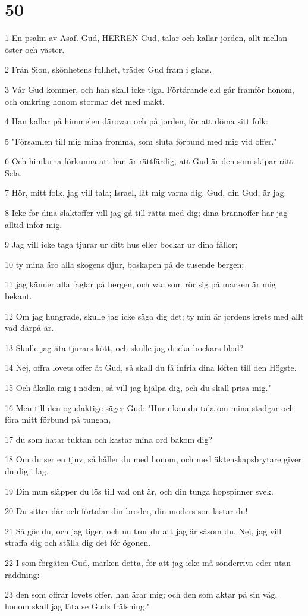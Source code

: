 \chapter{50}

\par 1 En psalm av Asaf. Gud, HERREN Gud, talar och kallar jorden, allt mellan öster och väster.
\par 2 Från Sion, skönhetens fullhet, träder Gud fram i glans.
\par 3 Vår Gud kommer, och han skall icke tiga. Förtärande eld går framför honom, och omkring honom stormar det med makt.
\par 4 Han kallar på himmelen därovan och på jorden, för att döma sitt folk:
\par 5 "Församlen till mig mina fromma, som sluta förbund med mig vid offer."
\par 6 Och himlarna förkunna att han är rättfärdig, att Gud är den som skipar rätt. Sela.
\par 7 Hör, mitt folk, jag vill tala; Israel, låt mig varna dig. Gud, din Gud, är jag.
\par 8 Icke för dina slaktoffer vill jag gå till rätta med dig; dina brännoffer har jag alltid inför mig.
\par 9 Jag vill icke taga tjurar ur ditt hus eller bockar ur dina fållor;
\par 10 ty mina äro alla skogens djur, boskapen på de tusende bergen;
\par 11 jag känner alla fåglar på bergen, och vad som rör sig på marken är mig bekant.
\par 12 Om jag hungrade, skulle jag icke säga dig det; ty min är jordens krets med allt vad därpå är.
\par 13 Skulle jag äta tjurars kött, och skulle jag dricka bockars blod?
\par 14 Nej, offra lovets offer åt Gud, så skall du få infria dina löften till den Högste.
\par 15 Och åkalla mig i nöden, så vill jag hjälpa dig, och du skall prisa mig."
\par 16 Men till den ogudaktige säger Gud: "Huru kan du tala om mina stadgar och föra mitt förbund på tungan,
\par 17 du som hatar tuktan och kastar mina ord bakom dig?
\par 18 Om du ser en tjuv, så håller du med honom, och med äktenskapsbrytare giver du dig i lag.
\par 19 Din mun släpper du lös till vad ont är, och din tunga hopspinner svek.
\par 20 Du sitter där och förtalar din broder, din moders son lastar du!
\par 21 Så gör du, och jag tiger, och nu tror du att jag är såsom du. Nej, jag vill straffa dig och ställa dig det för ögonen.
\par 22 I som förgäten Gud, märken detta, för att jag icke må sönderriva eder utan räddning:
\par 23 den som offrar lovets offer, han ärar mig; och den som aktar på sin väg, honom skall jag låta se Guds frälsning."

